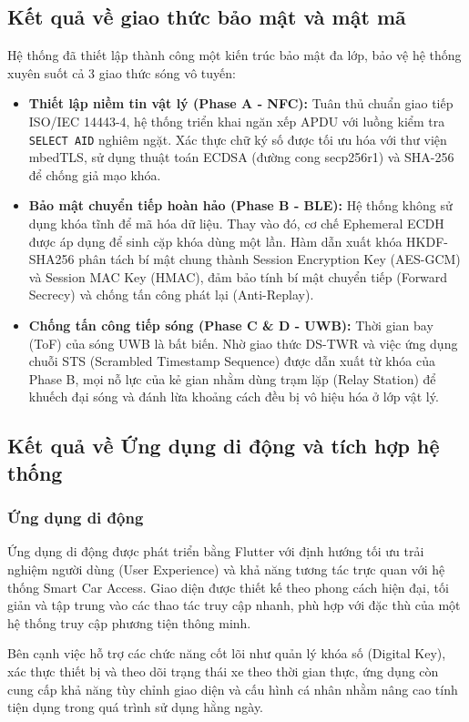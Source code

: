 \subsection{Kết quả về giao thức bảo mật và mật mã}

Hệ thống đã thiết lập thành công một kiến trúc bảo mật đa lớp, bảo vệ hệ thống xuyên suốt cả 3 giao thức sóng vô tuyến:

\begin{itemize}
    \item \textbf{Thiết lập niềm tin vật lý (Phase A - NFC):} Tuân thủ chuẩn giao tiếp ISO/IEC 14443-4, hệ thống triển khai ngăn xếp APDU với luồng kiểm tra \texttt{SELECT AID} nghiêm ngặt. Xác thực chữ ký số được tối ưu hóa với thư viện mbedTLS, sử dụng thuật toán ECDSA (đường cong secp256r1) và SHA-256 để chống giả mạo khóa.
    \item \textbf{Bảo mật chuyển tiếp hoàn hảo (Phase B - BLE):} Hệ thống không sử dụng khóa tĩnh để mã hóa dữ liệu. Thay vào đó, cơ chế Ephemeral ECDH được áp dụng để sinh cặp khóa dùng một lần. Hàm dẫn xuất khóa HKDF-SHA256 phân tách bí mật chung thành Session Encryption Key (AES-GCM) và Session MAC Key (HMAC), đảm bảo tính bí mật chuyển tiếp (Forward Secrecy) và chống tấn công phát lại (Anti-Replay).
    \item \textbf{Chống tấn công tiếp sóng (Phase C \& D - UWB):} Thời gian bay (ToF) của sóng UWB là bất biến. Nhờ giao thức DS-TWR và việc ứng dụng chuỗi STS (Scrambled Timestamp Sequence) được dẫn xuất từ khóa của Phase B, mọi nỗ lực của kẻ gian nhằm dùng trạm lặp (Relay Station) để khuếch đại sóng và đánh lừa khoảng cách đều bị vô hiệu hóa ở lớp vật lý.
\end{itemize}

\subsection{Kết quả về Ứng dụng di động và tích hợp hệ thống}
\subsubsection{Ứng dụng di động}
Ứng dụng di động được phát triển bằng Flutter với định hướng tối ưu trải nghiệm người dùng (User Experience) và khả năng tương tác trực quan với hệ thống Smart Car Access. Giao diện được thiết kế theo phong cách hiện đại, tối giản và tập trung vào các thao tác truy cập nhanh, phù hợp với đặc thù của một hệ thống truy cập phương tiện thông minh.

Bên cạnh việc hỗ trợ các chức năng cốt lõi như quản lý khóa số (Digital Key), xác thực thiết bị và theo dõi trạng thái xe theo thời gian thực, ứng dụng còn cung cấp khả năng tùy chỉnh giao diện và cấu hình cá nhân nhằm nâng cao tính tiện dụng trong quá trình sử dụng hằng ngày.

